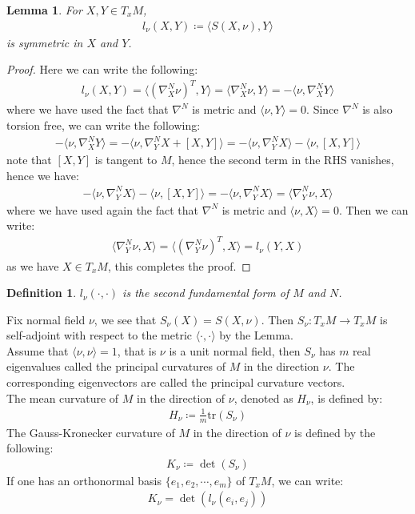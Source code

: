 \documentclass[11pt]{book}
\theoremstyle{break}
\theoremstyle{break}
\newtheorem{lem}{Lemma}[thm]
\newtheorem{defn}{Definition}[corL]
\begin{document}
\begin{lem}
For $X,Y \in T_xM$,
\begin{align*}
l_\nu(X,Y) \coloneqq \langle S(X,\nu) , Y \rangle
\end{align*}
is symmetric in $X$ and $Y$. 
\end{lem}
\begin{proof}
Here we can write the following:
\begin{align*}
l_\nu(X,Y) = \langle (\nabla_X^N\nu)^T,Y\rangle = \langle \nabla_X^N \nu, Y \rangle  = -\langle \nu, \nabla_X^NY \rangle
\end{align*}
where we have used the fact that $\nabla^N$ is metric and $\langle \nu, Y\rangle = 0$. Since $\nabla^N$ is also torsion free, we can write the following:
\begin{align*}
 -\langle \nu, \nabla_X^NY \rangle = -\langle \nu , \nabla_Y^NX + [X,Y]\rangle = -\langle \nu, \nabla_Y^NX\rangle - \langle \nu , [X,Y]\rangle
\end{align*}
note that $[X,Y]$ is tangent to $M$, hence the second term in the RHS vanishes, hence we have:
\begin{align*}
 -\langle \nu, \nabla_Y^NX\rangle - \langle \nu , [X,Y]\rangle = -\langle \nu, \nabla_Y^NX\rangle =\langle \nabla_Y^N \nu, X\rangle 
\end{align*}
where we have used again the fact that $\nabla^N$ is metric and $\langle \nu, X\rangle = 0$. Then we can write:
\begin{align*}
\langle \nabla_Y^N \nu, X\rangle  = \langle (\nabla_Y^N \nu)^T,X\rangle = l_\nu(Y,X)
\end{align*}
as we have $X \in T_xM$, this completes the proof.
\end{proof}
\begin{defn}
$l_\nu(\cdot,\cdot)$ is the second fundamental form of $M$ and $N$. 
\end{defn}

Fix normal field $\nu$, we see that $S_{\nu}(X) = S(X,\nu)$. Then $S_\nu:T_xM \to T_xM$ is self-adjoint with respect to the metric $\langle \cdot,\cdot\rangle$ by the Lemma.\\

Assume that $\langle \nu, \nu \rangle = 1$, that is $\nu$ is a unit normal field, then $S_\nu$ has $m$ real eigenvalues called the principal curvatures of $M$ in the direction $\nu$. The corresponding eigenvectors are called the principal curvature vectors. \\

The mean curvature of $M$ in the direction of $\nu$, denoted as $H_\nu$, is defined by:
\begin{align*}
H_\nu \coloneqq \frac{1}{m}\text{tr}(S_\nu)
\end{align*}
The Gauss-Kronecker curvature of $M$ in the direction of $\nu$ is defined by the following:
\begin{align*}
K_{\nu}\coloneqq \det(S_\nu)
\end{align*}
If one has an orthonormal basis $\{e_1,e_2,\cdots, e_m\}$ of $T_xM$, we can write:
\begin{align*}
K_\nu = \det(l_\nu(e_i,e_j))
\end{align*}
\end{document}
